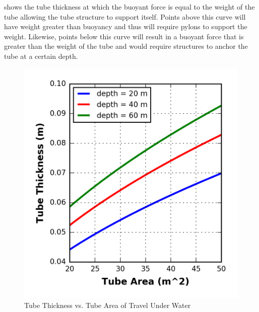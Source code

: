  shows the tube thickness at which the buoyant force is equal to the weight of the tube allowing the tube structure to support itself. Points above this curve will have weight greater than buoyancy and thus will require pylons to support the weight. Likewise, points below this curve will result in a buoyant force that is greater than the weight of the tube and would require structures to anchor the tube at a certain depth.

\begin{figure}
	\centering
	\includegraphics{../../images/graphs/underwater_structural_trades/tube_area_vs_depth.png}
	\caption{Tube Thickness vs. Tube Area of Travel Under Water}
	\label{fig:tube_thick_vs_tube_area_underwater}
\end{figure}

